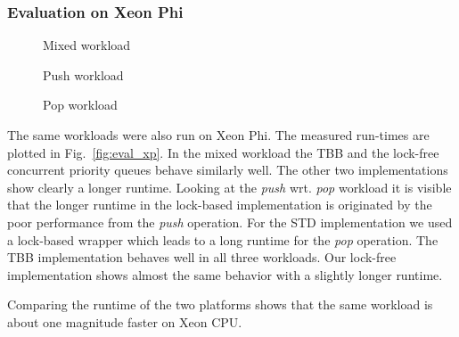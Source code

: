 \subsubsection{Evaluation on Xeon Phi}
\begin{figure*}[t]
	\centering
	\begin{subfigure}[b]{0.3\textwidth}
		\centering
		
		\caption{Mixed workload}
		\label{fig:xp_mixed}
	\end{subfigure}
	\hfill
	\begin{subfigure}[b]{0.3\textwidth}
		\centering
		
		\caption{Push workload}
		\label{fig:xp_push}
	\end{subfigure}
	\hfill
	\begin{subfigure}[b]{0.3\textwidth}
		\centering
		
		\caption{Pop workload}
		\label{fig:xp_pop}
	\end{subfigure}
	\caption{Runtime for different workloads executed on a Xeon Phi while varying the number of threads}
	\label{fig:eval_xp}
\end{figure*}
The same workloads were also run on Xeon Phi. The measured run-times are plotted in Fig.~\ref{fig:eval_xp}.
In the mixed workload the TBB and the lock-free concurrent priority queues behave similarly well. The other two implementations show clearly a longer runtime.
Looking at the \textit{push} wrt. \textit{pop} workload it is visible that the longer runtime in the lock-based implementation is originated by the poor performance from the \textit{push} operation. For the STD implementation we used a lock-based wrapper which leads to a long runtime for the \textit{pop} operation.
The TBB implementation behaves well in all three workloads.
Our lock-free implementation shows almost the same behavior with a slightly longer runtime.

Comparing the runtime of the two platforms shows that the same workload is about one magnitude faster on Xeon CPU.

